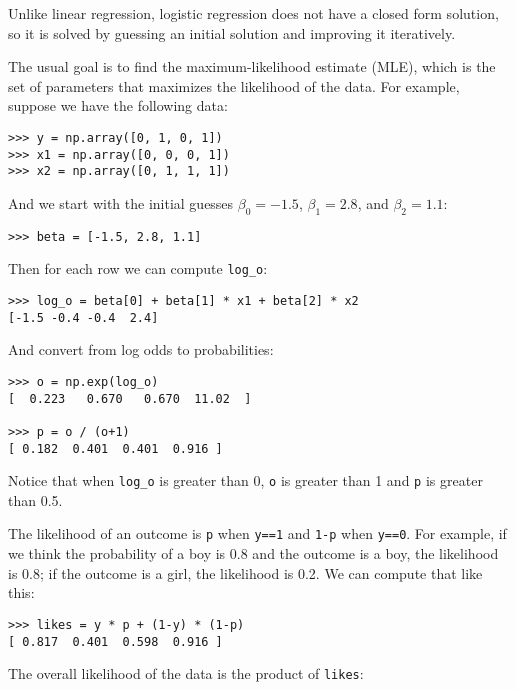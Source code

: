 \documentclass[12pt]{book}
\begin{document}
Unlike linear regression, logistic regression does not have a
closed form solution, so it is solved by guessing an initial
solution and improving it iteratively.

The usual goal is to find the maximum-likelihood estimate (MLE),
which is the set of parameters that maximizes the likelihood of the
data.  For example, suppose we have the following data:

\begin{verbatim}
>>> y = np.array([0, 1, 0, 1])
>>> x1 = np.array([0, 0, 0, 1])
>>> x2 = np.array([0, 1, 1, 1])
\end{verbatim}

And we start with the initial guesses $\beta_0=-1.5$, $\beta_1=2.8$,
and $\beta_2=1.1$:

\begin{verbatim}
>>> beta = [-1.5, 2.8, 1.1]
\end{verbatim}

Then for each row we can compute \verb"log_o":

\begin{verbatim}
>>> log_o = beta[0] + beta[1] * x1 + beta[2] * x2 
[-1.5 -0.4 -0.4  2.4]
\end{verbatim}

And convert from log odds to probabilities:

\begin{verbatim}
>>> o = np.exp(log_o)
[  0.223   0.670   0.670  11.02  ]

>>> p = o / (o+1)
[ 0.182  0.401  0.401  0.916 ]
\end{verbatim}

Notice that when \verb"log_o" is greater than 0, {\tt o}
is greater than 1 and {\tt p} is greater than 0.5.

The likelihood of an outcome is {\tt p} when {\tt y==1} and {\tt 1-p}
when {\tt y==0}.  For example, if we think the probability of a boy is
0.8 and the outcome is a boy, the likelihood is 0.8; if
the outcome is a girl, the likelihood is 0.2.  We can compute that
like this:

\begin{verbatim}
>>> likes = y * p + (1-y) * (1-p)
[ 0.817  0.401  0.598  0.916 ]
\end{verbatim}

The overall likelihood of the data is the product of {\tt likes}:
\end{document}
